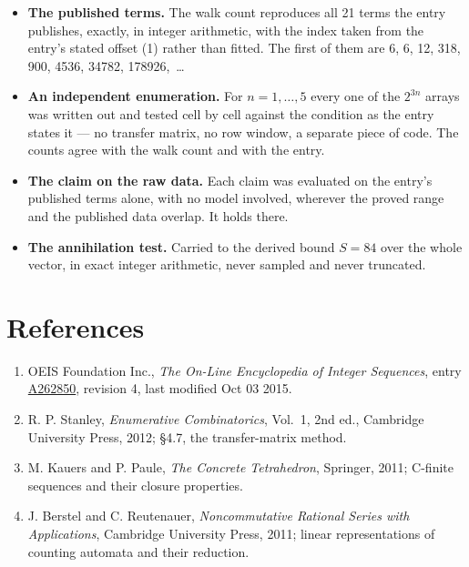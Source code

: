 \documentclass[11pt]{article}
\theoremstyle{definition}
\begin{document}
\begin{itemize}

\item {\bfseries The published terms.} The walk count reproduces all 21 terms the entry publishes, exactly, in integer arithmetic, with the index taken from the entry's stated offset (1) rather than fitted. The first of them are 6, 6, 12, 318, 900, 4536, 34782, 178926,~\dots

\item {\bfseries An independent enumeration.} For $n = 1,\dots,5$ every one of the $2^{3n}$ arrays was written out and tested cell by cell against the condition as the entry states it --- no transfer matrix, no row window, a separate piece of code. The counts agree with the walk count and with the entry.

\item {\bfseries The claim on the raw data.} Each claim was evaluated on the entry's published terms alone, with no model involved, wherever the proved range and the published data overlap. It holds there.

\item {\bfseries The annihilation test.} Carried to the derived bound $S = 84$ over the whole vector, in exact integer arithmetic, never sampled and never truncated.

\end{itemize}

\section{References}

\begin{enumerate}

\item OEIS Foundation Inc., \emph{The On-Line Encyclopedia of Integer Sequences}, entry \href{https://oeis.org/A262850}{A262850}, revision 4, last modified Oct 03 2015.

\item R. P. Stanley, \emph{Enumerative Combinatorics}, Vol.~1, 2nd ed., Cambridge University Press, 2012; \S4.7, the transfer-matrix method.

\item M. Kauers and P. Paule, \emph{The Concrete Tetrahedron}, Springer, 2011; C-finite sequences and their closure properties.

\item J. Berstel and C. Reutenauer, \emph{Noncommutative Rational Series with Applications}, Cambridge University Press, 2011; linear representations of counting automata and their reduction.

\end{enumerate}
\end{document}
